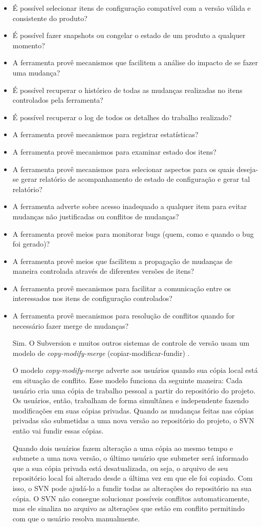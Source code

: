 \begin{itemize}
  
  \item É possível selecionar itens de configuração compatível com a versão válida e consistente do
  produto?
  \item É possível fazer snapshots ou congelar o estado de um produto a qualquer momento?
  \item A ferramenta provê mecanismos que facilitem a análise do impacto de se fazer uma mudança?
  \item É possível recuperar o histórico de todas as mudanças realizadas no itens controlados pela
  ferramenta?
  \item É possível recuperar o log de todos os detalhes do trabalho realizado?
  \item A ferramenta provê mecanismos para registrar estatísticas?
  \item A ferramenta provê mecanismos para examinar estado dos itens?
  \item A ferramenta provê mecanismos para selecionar aspectos para os quais deseja-se gerar relatório
  de acompanhamento de estado de configuração e gerar tal relatório?
  \item A ferramenta adverte sobre acesso inadequado a qualquer item para evitar mudanças não justificadas
  ou conflitos de mudanças?
  \item A ferramenta provê meios para monitorar bugs (quem, como e quando o bug foi gerado)?
  \item A ferramenta provê meios que facilitem a propagação de mudanças de maneira controlada
  através de diferentes versões de itens?
  \item A ferramenta provê mecanismos para facilitar a comunicação entre os interessados nos itens de
  configuração controlados?
  \item A ferramenta provê mecanismos para resolução de conflitos quando for necessário fazer merge
  de mudanças?
  
  Sim. O Subversion e muitos outros sistemas de controle de versão usam um modelo de \textit{copy-modify-merge} (copiar-modificar-fundir) \cite{svn-book}. 
  
  O modelo \textit{copy-modify-merge} adverte aos usuários quando sua cópia local está em situação de conflito.
  Esse modelo funciona da seguinte maneira: 
  Cada usuário cria uma cópia de trabalho pessoal a partir do repositório do projeto. Os usuários, então, 
  trabalham de forma simultânea e independente fazendo modificações em suas cópias privadas. Quando as mudanças 
  feitas nas cópias privadas são submetidas a uma nova versão ao repositório do projeto, o SVN então vai fundir essas cópias.
  
  Quando dois usuários fazem alteração a uma cópia ao mesmo tempo e submete a uma nova versão, o último usuário que submeter será informado
  que a sua cópia privada está desatualizada, ou seja, o arquivo de seu repositório local foi alterado desde a 
  última vez em que ele foi copiado. Com isso, o SVN pode ajudá-lo a fundir todas as alterações do repositório na sua cópia. 
  O SVN não consegue solucionar possíveis conflitos automaticamente, mas ele sinaliza no arquivo as alterações que estão em conflito
   permitindo com que o usuário resolva manualmente.
\end{itemize}
